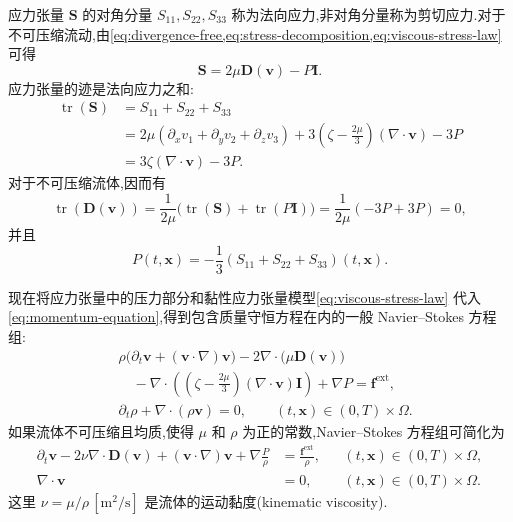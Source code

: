 \begin{note}\label{note:stress-trace}
应力张量 $\bm{S}$ 的对角分量 $S_{11},S_{22},S_{33}$ 称为法向应力,非对角分量称为剪切应力.对于不可压缩流动,由\cref{eq:divergence-free,eq:stress-decomposition,eq:viscous-stress-law} 可得
\begin{equation}\label{eq:incompressible-stress}
  \bm{S}=2\mu\bm{D}(\bm{v})-P\bm{I}.
\end{equation}
应力张量的迹是法向应力之和:
\begin{equation*}
\begin{aligned}
  \operatorname{tr}(\bm{S})
  &=S_{11}+S_{22}+S_{33}\\
  &=2\mu(\partial_xv_1+\partial_yv_2+\partial_zv_3)
    +3\left(\zeta-\frac{2\mu}{3}\right)(\nabla\cdot\bm{v})-3P\\
  &=3\zeta(\nabla\cdot\bm{v})-3P.
\end{aligned}
\end{equation*}
对于不可压缩流体,因而有
\begin{equation*}
  \operatorname{tr}(\bm{D}(\bm{v}))
  =\frac{1}{2\mu}\bigl(\operatorname{tr}(\bm{S})
       +\operatorname{tr}(P\bm{I})\bigr)
  =\frac{1}{2\mu}(-3P+3P)=0,
\end{equation*}
并且
\begin{equation}\label{eq:pressure-from-stress-trace}
  P(t,\bm{x})=-\frac{1}{3}
    (S_{11}+S_{22}+S_{33})(t,\bm{x}).
\end{equation}
\end{note}

\begin{note}\label{note:full-navier-stokes}
现在将应力张量中的压力部分和黏性应力张量模型\cref{eq:viscous-stress-law} 代入\cref{eq:momentum-equation},得到包含质量守恒方程在内的一般 Navier--Stokes 方程组:
\begin{equation}\label{eq:general-navier-stokes}
\begin{aligned}
  &\rho\bigl(\partial_t\bm{v}
        +(\bm{v}\cdot\nabla)\bm{v}\bigr)
   -2\nabla\cdot\bigl(\mu\bm{D}(\bm{v})\bigr)\\
  &\quad-\nabla\cdot\left(
      \left(\zeta-\frac{2\mu}{3}\right)
      (\nabla\cdot\bm{v})\bm{I}\right)
      +\nabla P=\bm{f}^{\mathrm{ext}},\\
  &\partial_t\rho+\nabla\cdot(\rho\bm{v})=0,
  \qquad (t,\bm{x})\in(0,T)\times\Omega.
\end{aligned}
\end{equation}
如果流体不可压缩且均质,使得 $\mu$ 和 $\rho$ 为正的常数,Navier--Stokes 方程组可简化为
\begin{equation}\label{eq:incompressible-navier-stokes}
\begin{aligned}
  \partial_t\bm{v}-2\nu\nabla\cdot\bm{D}(\bm{v})
    +(\bm{v}\cdot\nabla)\bm{v}
    +\nabla\frac{P}{\rho}
  &=\frac{\bm{f}^{\mathrm{ext}}}{\rho},
  &&(t,\bm{x})\in(0,T)\times\Omega,\\
  \nabla\cdot\bm{v}&=0,
  &&(t,\bm{x})\in(0,T)\times\Omega.
\end{aligned}
\end{equation}
这里 $\nu=\mu/\rho\,[\mathrm{m}^2/\mathrm{s}]$ 是流体的运动黏度(kinematic viscosity).
\end{note}

